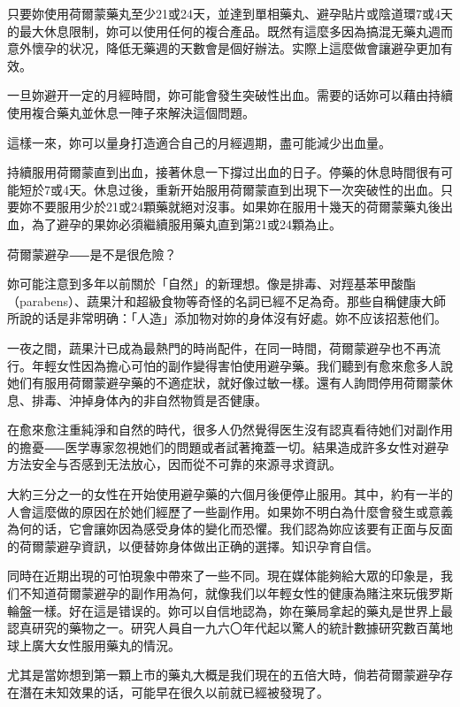 \documentclass[12pt,UTF8]{ctexbook}
\begin{document}
只要妳使用荷爾蒙藥丸至少21或24天，並達到單相藥丸、避孕貼片或陰道環7或4天的最大休息限制，妳可以使用任何的複合產品。既然有這麼多因為搞混无藥丸週而意外懷孕的状况，降低无藥週的天數會是個好辦法。实際上這麼做會讓避孕更加有效。

一旦妳避开一定的月經時間，妳可能會發生突破性出血。需要的话妳可以藉由持續使用複合藥丸並休息一陣子來解決這個問題。

這樣一來，妳可以量身打造適合自己的月經週期，盡可能減少出血量。

持續服用荷爾蒙直到出血，接著休息一下撐过出血的日子。停藥的休息時間很有可能短於7或4天。休息过後，重新开始服用荷爾蒙直到出現下一次突破性的出血。只要妳不要服用少於21或24顆藥就絕对沒事。如果妳在服用十幾天的荷爾蒙藥丸後出血，為了避孕的果妳必須繼續服用藥丸直到第21或24顆為止。





荷爾蒙避孕⸺是不是很危險？




妳可能注意到多年以前關於「自然」的新理想。像是排毒、对羥基苯甲酸酯（parabens）、蔬果汁和超級食物等奇怪的名詞已經不足為奇。那些自稱健康大師所說的话是非常明确：「人造」添加物对妳的身体沒有好處。妳不应该招惹他们。

一夜之間，蔬果汁已成為最熱門的時尚配件，在同一時間，荷爾蒙避孕也不再流行。年輕女性因為擔心可怕的副作變得害怕使用避孕藥。我们聽到有愈來愈多人說她们有服用荷爾蒙避孕藥的不適症狀，就好像过敏一樣。還有人詢問停用荷爾蒙休息、排毒、沖掉身体內的非自然物質是否健康。

在愈來愈注重純淨和自然的時代，很多人仍然覺得医生沒有認真看待她们对副作用的擔憂⸺医学專家忽視她们的問題或者試著掩蓋一切。結果造成許多女性对避孕方法安全与否感到无法放心，因而從不可靠的來源寻求資訊。

大約三分之一的女性在开始使用避孕藥的六個月後便停止服用。其中，約有一半的人會這麼做的原因在於她们經歷了一些副作用。如果妳不明白為什麼會發生或意義為何的话，它會讓妳因為感受身体的變化而恐懼。我们認為妳应该要有正面与反面的荷爾蒙避孕資訊，以便替妳身体做出正确的選擇。知识孕育自信。

同時在近期出現的可怕現象中帶來了一些不同。現在媒体能夠給大眾的印象是，我们不知道荷爾蒙避孕的副作用為何，就像我们以年輕女性的健康為賭注來玩俄罗斯輪盤一樣。好在這是错误的。妳可以自信地認為，妳在藥局拿起的藥丸是世界上最認真研究的藥物之一。研究人員自一九六〇年代起以驚人的統計數據研究數百萬地球上廣大女性服用藥丸的情況。

尤其是當妳想到第一顆上市的藥丸大概是我们現在的五倍大時，倘若荷爾蒙避孕存在潛在未知效果的话，可能早在很久以前就已經被發現了。
\end{document}
